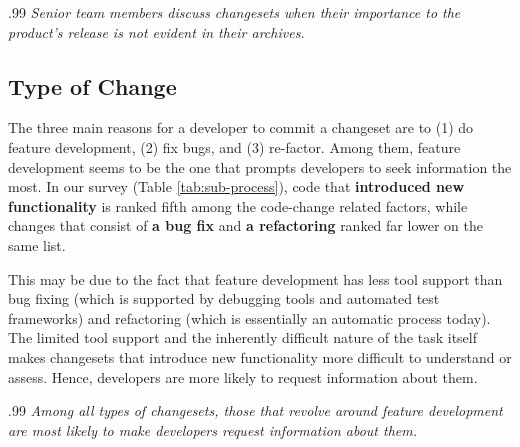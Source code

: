 \documentclass{sig-alternate}
\newenvironment{note}%
{\medskip
\noindent
\vspace{2pt}
\let\emph=\textbf
\begin{boxedminipage}{.99\columnwidth}\em}%
{\end{boxedminipage}}
\begin{document}
\begin{note}
Senior team members discuss changesets when their importance to the product's release is not evident in their archives.
\end{note}


\subsection{Type of Change}

The three main reasons for a developer to commit a changeset are to (1) do feature development, (2) fix bugs, and (3) re-factor. Among them, feature development seems to be the one that prompts developers to seek information the most.
In our survey (Table \ref{tab:sub-process}), code that \emph{introduced new functionality} is ranked fifth among the code-change related factors, while changes that consist of \emph{a bug fix} and \emph{a refactoring} ranked far lower on the same list.

This may be due to the fact that feature development has less tool support than bug fixing (which is supported by debugging tools and automated test frameworks) and refactoring (which is essentially an automatic process today). The limited tool support and the inherently difficult nature of the task itself makes changesets that introduce new functionality more difficult to understand or assess. Hence, developers are more likely to request information about them.

\begin{note}
Among all types of changesets, those that revolve around feature development are most likely to make developers request information about them.
\end{note}






\end{document}
